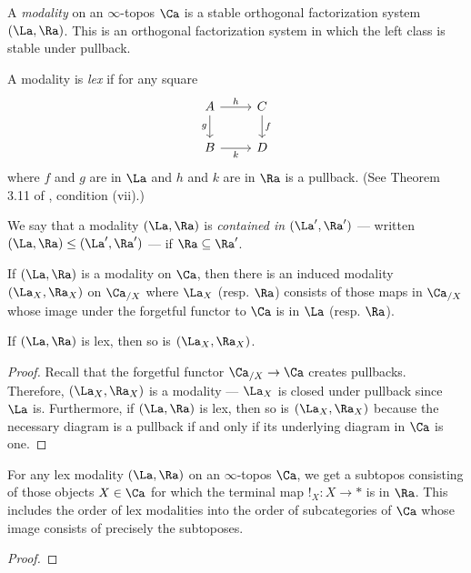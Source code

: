 \begin{defn}
A \emph{modality} on an $\infty$-topos $\Ca$ is a stable orthogonal factorization
system $(\La, \Ra)$. This is an orthogonal factorization system in which the
left class is stable under pullback.

A modality is \emph{lex} if for any square
\[
\begin{tikzcd}
A \arrow[r, "h"] \arrow[d, "g"'] & C \arrow[d, "f"] \\
B \arrow[r, "k"']                & D               
\end{tikzcd}
\]
where $f$ and $g$ are in $\La$ and $h$ and $k$ are in $\Ra$ is a pullback. (See
Theorem 3.11 of \cite{RSS:Modalties.in.HoTT}, condition (vii).)


We say that a modality $(\La, \Ra)$ is \emph{contained in} $(\La', \Ra')$ ---
written $(\La, \Ra) \leq (\La', \Ra')$ --- if $\Ra \subseteq \Ra'$.
\end{defn}

\begin{lem}\label{lem:slice.modality}
If $(\La, \Ra)$ is a modality on $\Ca$, then there is an induced modality $(\La_X,
\Ra_X)$ on $\Ca_{/X}$ where $\La_X$ (resp. $\Ra$) consists of those maps in $\Ca_{/X}$
whose image under the forgetful functor to $\Ca$ is in $\La$ (resp. $\Ra$).

If $(\La, \Ra)$ is lex, then so is $(\La_X, \Ra_X)$.
\end{lem}
\begin{proof}

Recall that the forgetful functor $\Ca_{/X} \to \Ca$ creates pullbacks. Therefore,
$(\La_X, \Ra_X)$ is a modality --- $\La_X$ is closed under pullback since $\La$
is. Furthermore, if $(\La, \Ra)$ is lex, then so is $(\La_X, \Ra_X)$ because the
necessary diagram is a pullback if and only if its underlying diagram in $\Ca$
is one. 
\end{proof}

\begin{prop}\label{prop:lex.modalities.subtoposes}
  For any lex modality $(\La, \Ra)$ on an $\infty$-topos $\Ca$, we get a subtopos
  consisting of those objects $X \in \Ca$ for which the terminal map $!_X : X
  \to \ast$ is in $\Ra$. This includes the order of lex modalities into the
  order of subcategories of $\Ca$ whose image consists of precisely the subtoposes.
\end{prop}
\begin{proof}
\end{proof}

